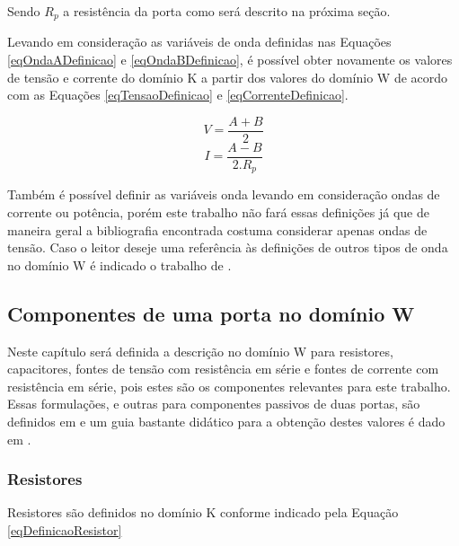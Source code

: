 	Sendo $R_p$ a resistência da porta como será descrito na próxima seção.
	
	Levando em consideração as variáveis de onda definidas nas Equações \ref{eqOndaADefinicao} e \ref{eqOndaBDefinicao}, é possível obter novamente os valores de tensão e corrente do domínio K a partir dos valores do domínio W de acordo com as Equações \ref{eqTensaoDefinicao} e \ref{eqCorrenteDefinicao}.
	
	\begin{equation}
		\label{eqTensaoDefinicao}
		V = \frac{A + B}{2}
	\end{equation} 
	\begin{equation}
		\label{eqCorrenteDefinicao}
		I = \frac{A - B }{2 . R_p}
	\end{equation}
	
	Também é possível definir as variáveis onda levando em consideração ondas de corrente ou potência, porém este trabalho não fará essas definições já que de maneira geral a bibliografia encontrada costuma considerar apenas ondas de tensão. Caso o leitor deseje uma referência às definições de outros tipos de onda no domínio W é indicado o trabalho de . 
	
	\subsection{Componentes de uma porta no domínio W}
	Neste capítulo será definida a descrição no domínio W para resistores, capacitores, fontes de tensão com resistência em série e fontes de corrente com resistência em série, pois estes são os componentes relevantes para este trabalho. Essas formulações, e outras para componentes passivos de duas portas, são definidos em  e um guia bastante didático para a obtenção destes valores é dado em .
	 
		\subsubsection{Resistores}
	
	Resistores são definidos no domínio K conforme indicado pela Equação \ref{eqDefinicaoResistor}
	
